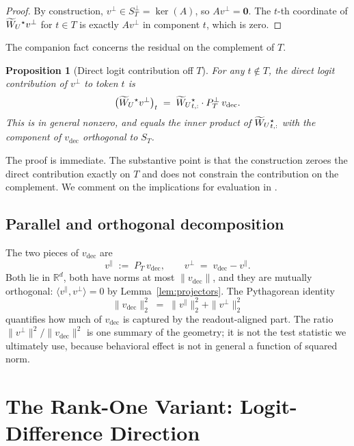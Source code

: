 \documentclass[11pt,letterpaper]{article}
\theoremstyle{plain}
\newtheorem{proposition}[theorem]{Proposition}
\theoremstyle{definition}
\newcommand{\R}{\mathbb{R}}
\newcommand{\1}{\mathbf{1}}
\newcommand{\zero}{\mathbf{0}}
\newcommand{\WUt}{\widetilde{W}_{U}\mathchoice{}{}{}{}}
\newcommand{\vdec}{v_{\text{dec}}}
\newcommand{\vperp}{v^{\perp}}
\newcommand{\vpar}{v^{\parallel}}
\newcommand{\PT}{P_{T}}
\newcommand{\PTperp}{P_{T}^{\perp}}
\begin{document}
\begin{proof}
By construction, $\vperp \in S_T^\perp = \ker(A)$, so $A \vperp = \zero$. The $t$-th coordinate of $\WUt^\star \vperp$ for $t \in T$ is exactly $A \vperp$ in component $t$, which is zero.
\end{proof}

The companion fact concerns the residual on the complement of $T$.

\begin{proposition}[Direct logit contribution off $T$]\label{prop:offT}
For any $t \notin T$, the direct logit contribution of $\vperp$ to token $t$ is
\begin{equation}
\big(\WUt^\star \vperp\big)_t \;=\; \WUt^\star_{t,:} \cdot \PTperp \,\vdec.
\label{eq:offTcontribution}
\end{equation}
This is in general nonzero, and equals the inner product of $\WUt^\star_{t,:}$ with the component of $\vdec$ orthogonal to $S_T$.
\end{proposition}

The proof is immediate. The substantive point is that the construction zeroes the direct contribution exactly on $T$ and does not constrain the contribution on the complement. We comment on the implications for evaluation in .

\subsection{Parallel and orthogonal decomposition}

The two pieces of $\vdec$ are
\begin{equation}
\vpar \;:=\; \PT \,\vdec, \qquad \vperp \;=\; \vdec - \vpar.
\label{eq:decomp}
\end{equation}
Both lie in $\R^d$, both have norms at most $\|\vdec\|$, and they are mutually orthogonal: $\langle \vpar, \vperp \rangle = 0$ by Lemma~\ref{lem:projectors}. The Pythagorean identity
\begin{equation}
\|\vdec\|_2^2 \;=\; \|\vpar\|_2^2 + \|\vperp\|_2^2
\label{eq:pythagoras}
\end{equation}
quantifies how much of $\vdec$ is captured by the readout-aligned part. The ratio $\|\vperp\|^2 / \|\vdec\|^2$ is one summary of the geometry; it is not the test statistic we ultimately use, because behavioral effect is not in general a function of squared norm.

\section{The Rank-One Variant: Logit-Difference Direction}\label{sec:logitdiff}
\end{document}
